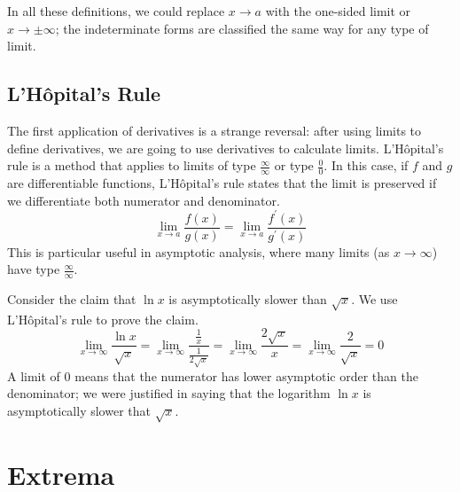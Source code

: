 \documentclass[fleqn]{report}
\begin{document}
In all these definitions, we could replace $x \rightarrow a$
with the one-sided limit or $x \rightarrow \pm \infty$; the
indeterminate forms are classified the same way for any type
of limit.

\section*{L'H\^opital's Rule}

The first application of derivatives is a strange reversal:
after using limits to define derivatives, we are going to use
derivatives to calculate limits.  L'H\^opital's rule is a
method that applies to limits of type $\frac{\infty}{\infty}$
or type $\frac{0}{0}$. In this case, if $f$ and $g$ are
differentiable functions, L'H\^opital's rule states that the
limit is preserved if we differentiate both numerator and
denominator.
\begin{equation*}
\lim_{x \rightarrow a} \frac{f(x)}{g(x)} = 
\lim_{x \rightarrow a} \frac{f^\prime(x)}{g^\prime(x)} 
\end{equation*}
This is particular useful in asymptotic analysis, where many
limits (as $x \rightarrow \infty$) have type
$\frac{\infty}{\infty}$. 

\begin{example}
Consider  the claim that
$\ln x$ is asymptotically slower than $\sqrt{x}$. We use
L'H\^opital's rule to prove the claim.
\begin{equation*}
\lim_{x \rightarrow \infty} \frac{\ln x}{\sqrt{x}} = \lim_{x
\rightarrow \infty} \frac{\frac{1}{x}}{\frac{1}{2\sqrt{x}}} =
\lim_{x \rightarrow \infty} \frac{2 \sqrt{x}}{x} = \lim_{x
\rightarrow \infty} \frac{2}{\sqrt{x}} = 0
\end{equation*}
A limit of $0$ means that the numerator has lower
asymptotic order than the denominator; we were justified in
saying that the logarithm $\ln x$ is asymptotically slower
that $\sqrt{x}$. 
\end{example}

\chapter{Extrema}
\label{Extrema}
\end{document}
